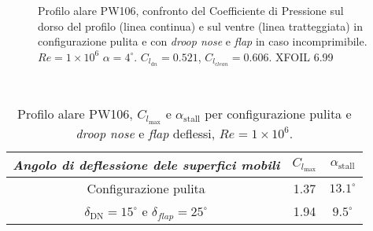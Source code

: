 \begin{figure} [H]
\centering
{}
\caption{\footnotesize Profilo alare PW106, confronto del Coefficiente di Pressione sul dorso del profilo (linea continua) e sul ventre (linea tratteggiata) in configurazione pulita e con {\itshape droop nose} e {\itshape flap} in caso incomprimibile. $Re=1\times10^6$ $\alpha =4 ^\circ$. $C_{l_{\mathrm dn}} = 0.521$, $C_{l_{\mathrm clean}} = 0.606$. XFOIL 6.99  }
\label{fig:dn3}
\end{figure}
\noindent \\ 
\begin{table} [!h]\centering {}
\begin{tabular}{c S c }
\toprule
\emph{Angolo di deflessione dele superfici mobili } &  $C_{l_{\mathrm{max}}}$  &  ${\alpha}_{\mathrm{stall}}$  \\ 
\midrule
Configurazione pulita & 1.37 & $13.1^\circ$   \\
$\delta_{\mathrm{DN}}=15^\circ$  e $\delta_{flap}=25 ^\circ$ & 1.94 & $9.5^\circ$  \\
\bottomrule 
\end{tabular}
\caption {Profilo alare PW106, $C_{l_{\mathrm{max}}}$ e ${\alpha}_{\mathrm{stall}}$ per configurazione pulita e {\itshape droop nose} e {\itshape flap} deflessi, $ Re=1\times10^6$.}
\label{tab:droopn1}
\end{table}
\noindent \\ \\

